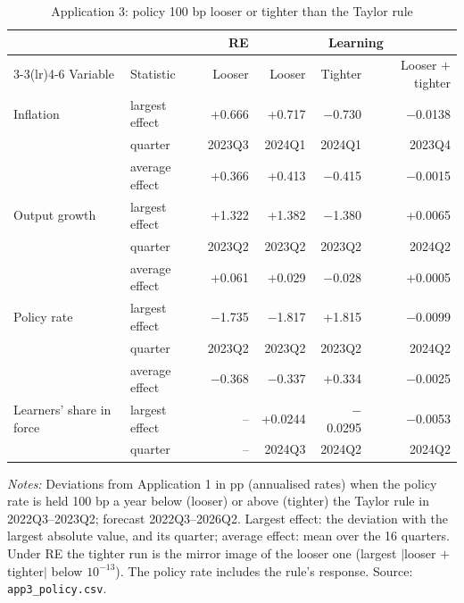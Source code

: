\begin{table}[tbp]
\centering
\small
\caption{Application 3: policy 100 bp looser or tighter than the Taylor rule}
\label{tab:app3}
\begin{tabular}{llrrrr}
\toprule
& & RE & \multicolumn{3}{c}{Learning} \\
\cmidrule(lr){3-3}\cmidrule(lr){4-6}
Variable & Statistic & Looser & Looser & Tighter & Looser $+$ tighter \\
\midrule
Inflation & largest effect & +0.666 & +0.717 & $-$0.730 & $-$0.0138 \\
 & quarter & 2023Q3 & 2024Q1 & 2024Q1 & 2023Q4 \\
 & average effect & +0.366 & +0.413 & $-$0.415 & $-$0.0015 \\
\addlinespace
Output growth & largest effect & +1.322 & +1.382 & $-$1.380 & +0.0065 \\
 & quarter & 2023Q2 & 2023Q2 & 2023Q2 & 2024Q2 \\
 & average effect & +0.061 & +0.029 & $-$0.028 & +0.0005 \\
\addlinespace
Policy rate & largest effect & $-$1.735 & $-$1.817 & +1.815 & $-$0.0099 \\
 & quarter & 2023Q2 & 2023Q2 & 2023Q2 & 2024Q2 \\
 & average effect & $-$0.368 & $-$0.337 & +0.334 & $-$0.0025 \\
\addlinespace
Learners' share in force & largest effect & -- & +0.0244 & $-$0.0295 & $-$0.0053 \\
 & quarter & -- & 2024Q3 & 2024Q2 & 2024Q2 \\
\bottomrule
\end{tabular}
\par\smallskip
\begin{minipage}{\linewidth}\footnotesize
\textit{Notes:} Deviations from Application 1 in pp (annualised rates) when the policy rate is held 100 bp a year below (looser) or above (tighter) the Taylor rule in 2022Q3--2023Q2; forecast 2022Q3--2026Q2. Largest effect: the deviation with the largest absolute value, and its quarter; average effect: mean over the 16 quarters. Under RE the tighter run is the mirror image of the looser one (largest $|$looser $+$ tighter$|$ below $10^{-13}$). The policy rate includes the rule's response. Source: \texttt{app3\_policy.csv}.
\end{minipage}
\end{table}
